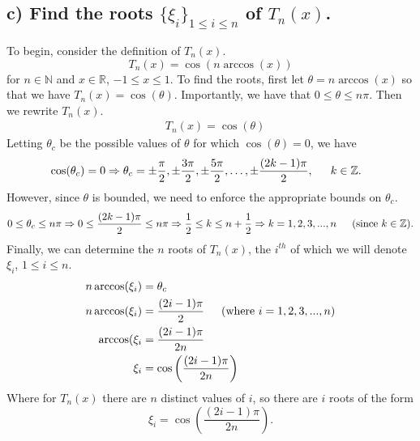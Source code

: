 \documentclass[11pt, letterpaper]{article}
\begin{document}
\subsection*{c) \normalfont Find the roots $\{\xi_i\}_{1\leq i\leq n}$ of $T_n(x)$.}
To begin, consider the definition of $T_n(x)$.
\[T_n(x)=\cos(n\arccos(x))\]
for $n\in\mathbb{N}$ and $x\in\mathbb{R}$, $-1\leq x\leq 1$. To find the roots, first let $\theta=n\arccos(x)$ 
so that we have $T_n(x)=\cos(\theta)$. Importantly, we have that $0\leq \theta\leq n\pi$. Then we rewrite $T_n(x)$.
\begin{align*}
    &T_n(x)=\cos(\theta)
\end{align*}
Letting $\theta_c$ be the possible values of $\theta$ for which $\cos(\theta)=0$, we have
\begin{align*}
    &\cos(\theta_c)=0\Rightarrow \theta_c=\pm\frac{\pi}{2},\pm\frac{3\pi}{2}, \pm\frac{5\pi}{2},\dots,\pm\frac{(2k-1)\pi}{2},\indent k\in\mathbb{Z}.
\end{align*}
However, since $\theta$ is bounded,  we need to enforce the appropriate bounds on $\theta_c$.
\[0\leq \theta_c\leq n\pi\Rightarrow 0\leq \frac{(2k-1)\pi}{2}\leq n\pi\Rightarrow \frac{1}{2}\leq k\leq n+\frac{1}{2}\Rightarrow k=1,2,3,...,n\text{\indent (since $k\in\mathbb{Z}$).}\]
Finally, we can determine the $n$ roots of $T_n(x)$, the $i^{th}$ of which we will denote $\xi_i$, $1\leq i\leq n$.
\begin{align*}
    n\arccos(\xi_i)&=\theta_c\\
    n\arccos(\xi_i)&=\frac{(2i-1)\pi}{2}\text{\indent (where $i=1,2,3,...,n$)}\\
    \arccos(\xi_i&=\frac{(2i-1)\pi}{2n}\\
    \xi_i&=\cos\left(\frac{(2i-1)\pi}{2n}\right)
\end{align*}
Where for $T_n(x)$ there are $n$ distinct values of $i$, so there are $i$ roots of the form
\[\xi_i=\cos\left(\frac{(2i-1)\pi}{2n}\right).\]
\end{document}
